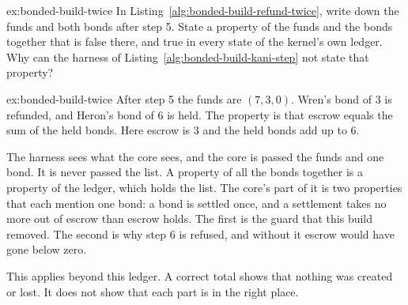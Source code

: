 \documentclass[11pt,a4paper]{article}
\theoremstyle{definition}
\theoremstyle{remark}
\begin{document}
\begin{pdexercise}[kind=Trace,rating=2]{ex:bonded-build-twice}
In Listing~\ref{alg:bonded-build-refund-twice}, write down the funds and both bonds after step 5. State a property of the funds and the bonds together that is false there, and true in every state of the kernel's own ledger. Why can the harness of Listing~\ref{alg:bonded-build-kani-step} not state that property?
\end{pdexercise}
\begin{pdsolution}{ex:bonded-build-twice}
After step 5 the funds are $(7,3,0)$. Wren's bond of 3 is refunded, and Heron's bond of 6 is held. The property is that escrow equals the sum of the held bonds. Here escrow is 3 and the held bonds add up to 6.

The harness sees what the core sees, and the core is passed the funds and one bond. It is never passed the list. A property of all the bonds together is a property of the ledger, which holds the list. The core's part of it is two properties that each mention one bond: a bond is settled once, and a settlement takes no more out of escrow than escrow holds. The first is the guard that this build removed. The second is why step 6 is refused, and without it escrow would have gone below zero.

This applies beyond this ledger. A correct total shows that nothing was created or lost. It does not show that each part is in the right place.
\end{pdsolution}
\end{document}
